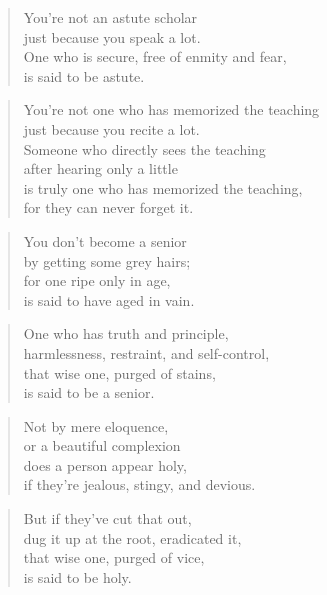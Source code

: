 \documentclass[12pt,openany]{book}%
\begin{document}
\begin{verse}%
You’re not an astute scholar \\
just because you speak a lot. \\
One who is secure, free of enmity and fear, \\
is said to be astute. 

%
\end{verse}

\begin{verse}%
You’re not one who has memorized the teaching \\
just because you recite a lot. \\
Someone who directly sees the teaching \\
after hearing only a little \\
is truly one who has memorized the teaching, \\
for they can never forget it. 

%
\end{verse}

\begin{verse}%
You don’t become a senior \\
by getting some grey hairs; \\
for one ripe only in age, \\
is said to have aged in vain. 

%
\end{verse}

\begin{verse}%
One who has truth and principle, \\
harmlessness, restraint, and self-control, \\
that wise one, purged of stains, \\
is said to be a senior. 

%
\end{verse}

\begin{verse}%
Not by mere eloquence, \\
or a beautiful complexion \\
does a person appear holy, \\
if they’re jealous, stingy, and devious. 

%
\end{verse}

\begin{verse}%
But if they’ve cut that out, \\
dug it up at the root, eradicated it, \\
that wise one, purged of vice, \\
is said to be holy. 

%
\end{verse}
\end{document}
